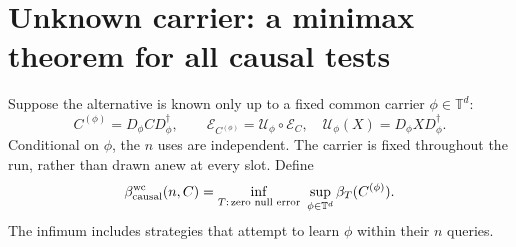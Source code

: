 \documentclass[11pt,a4paper]{article}
\theoremstyle{remark}
\newcommand{\T}{\mathbb T}
\newcommand{\E}{\mathcal E}
\begin{document}
\section{Unknown carrier: a minimax theorem for all causal tests}

Suppose the alternative is known only up to a fixed common carrier
\(\phi\in\T^d\):
\[
 C^{(\phi)}=D_\phi C D_\phi^\dagger,\qquad
 \E_{C^{(\phi)}}=\mathcal U_\phi\circ\E_C,\quad
 \mathcal U_\phi(X)=D_\phi XD_\phi^\dagger.
\]
Conditional on \(\phi\), the \(n\) uses are independent. The carrier is
fixed throughout the run, rather than drawn anew at every slot.
Define
\[
 \beta_{\rm causal}^{\rm wc}(n,C)
 =\inf_{T:\,\text{zero null error}}\ \sup_{\phi\in\T^d}
                   \beta_T(C^{(\phi)}).
\]
The infimum includes strategies that attempt to learn \(\phi\) within
their \(n\) queries.
\end{document}
